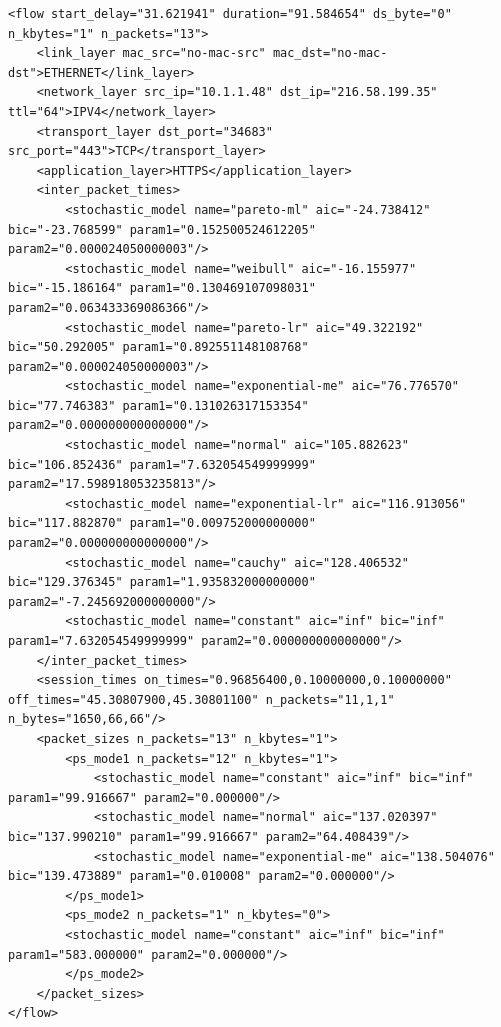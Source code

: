 \begin{verbatim}
<flow start_delay="31.621941" duration="91.584654" ds_byte="0" n_kbytes="1" n_packets="13">
	<link_layer mac_src="no-mac-src" mac_dst="no-mac-dst">ETHERNET</link_layer>
	<network_layer src_ip="10.1.1.48" dst_ip="216.58.199.35" ttl="64">IPV4</network_layer>
	<transport_layer dst_port="34683" src_port="443">TCP</transport_layer>
	<application_layer>HTTPS</application_layer>
	<inter_packet_times>
		<stochastic_model name="pareto-ml" aic="-24.738412" bic="-23.768599" param1="0.152500524612205" param2="0.000024050000003"/>
		<stochastic_model name="weibull" aic="-16.155977" bic="-15.186164" param1="0.130469107098031" param2="0.063433369086366"/>
		<stochastic_model name="pareto-lr" aic="49.322192" bic="50.292005" param1="0.892551148108768" param2="0.000024050000003"/>
		<stochastic_model name="exponential-me" aic="76.776570" bic="77.746383" param1="0.131026317153354" param2="0.000000000000000"/>
        <stochastic_model name="normal" aic="105.882623" bic="106.852436" param1="7.632054549999999" param2="17.598918053235813"/>
        <stochastic_model name="exponential-lr" aic="116.913056" bic="117.882870" param1="0.009752000000000" param2="0.000000000000000"/>
        <stochastic_model name="cauchy" aic="128.406532" bic="129.376345" param1="1.935832000000000" param2="-7.245692000000000"/>
        <stochastic_model name="constant" aic="inf" bic="inf" param1="7.632054549999999" param2="0.000000000000000"/>
    </inter_packet_times>
	<session_times on_times="0.96856400,0.10000000,0.10000000" off_times="45.30807900,45.30801100" n_packets="11,1,1" n_bytes="1650,66,66"/>
	<packet_sizes n_packets="13" n_kbytes="1">
		<ps_mode1 n_packets="12" n_kbytes="1">
			<stochastic_model name="constant" aic="inf" bic="inf" param1="99.916667" param2="0.000000"/>
			<stochastic_model name="normal" aic="137.020397" bic="137.990210" param1="99.916667" param2="64.408439"/>
			<stochastic_model name="exponential-me" aic="138.504076" bic="139.473889" param1="0.010008" param2="0.000000"/>
		</ps_mode1>
		<ps_mode2 n_packets="1" n_kbytes="0">
		<stochastic_model name="constant" aic="inf" bic="inf" param1="583.000000" param2="0.000000"/>
		</ps_mode2>
	</packet_sizes>
</flow>
\end{verbatim}



